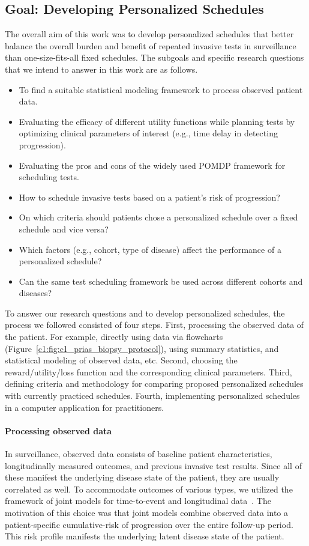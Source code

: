 \subsection{Goal: Developing Personalized Schedules}
\label{c1:subsec:goal}
The overall aim of this work was to develop personalized schedules that better balance the overall burden and benefit of repeated invasive tests in surveillance than one-size-fits-all fixed schedules. The subgoals and specific research questions that we intend to answer in this work are as follows.
\begin{itemize}
  \item To find a suitable statistical modeling framework to process observed patient data. 
  \item Evaluating the efficacy of different utility functions while planning tests by optimizing clinical parameters of interest (e.g., time delay in detecting progression).
  \item Evaluating the pros and cons of the widely used POMDP framework for scheduling tests.
  \item How to schedule invasive tests based on a patient's risk of progression?
  \item On which criteria should patients chose a personalized schedule over a fixed schedule and vice versa?
  \item Which factors (e.g., cohort, type of disease) affect the performance of a personalized schedule?
  \item Can the same test scheduling framework be used across different cohorts and diseases?
\end{itemize}
To answer our research questions and to develop personalized schedules, the process we followed consisted of four steps. First, processing the observed data of the patient. For example, directly using data via flowcharts (Figure~\ref{c1:fig:c1_prias_biopsy_protocol}), using summary statistics, and statistical modeling of observed data, etc. Second, choosing the reward/utility/loss function and the corresponding clinical parameters. Third, defining criteria and methodology for comparing proposed personalized schedules with currently practiced schedules. Fourth, implementing personalized schedules in a computer application for practitioners. 

\paragraph{Processing observed data} In surveillance, observed data consists of baseline patient characteristics, longitudinally measured outcomes, and previous invasive test results. Since all of these manifest the underlying disease state of the patient, they are usually correlated as well. To accommodate outcomes of various types, we utilized the framework of joint models for time-to-event and longitudinal data~\citep{rizopoulos2012joint, tsiatis2004joint}. The motivation of this choice was that joint models combine observed data into a patient-specific cumulative-risk of progression over the entire follow-up period. This risk profile manifests the underlying latent disease state of the patient.

